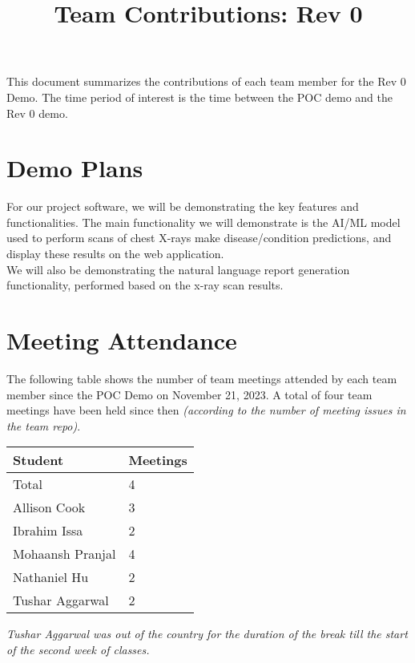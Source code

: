 \documentclass{article}
\title{Team Contributions: Rev 0\\\progname}
\author{\authname}
\date{}
\begin{document}
\maketitle

This document summarizes the contributions of each team member for the Rev 0
Demo.  The time period of interest is the time between the POC demo and the Rev
0 demo.

\section{Demo Plans}

For our project software, we will be demonstrating the key features and
functionalities. The main functionality we will demonstrate is the AI/ML model
used to perform scans of chest X-rays make disease/condition predictions, and
display these results on the web application. \\
We will also be demonstrating the natural language report generation
functionality, performed based on the x-ray scan results.

\section{Meeting Attendance}

The following table shows the number of team meetings attended by each team
member since the POC Demo on November 21, 2023. A total of four team meetings
have been held since then \textit{(according to the number of meeting issues
in the team repo)}.

\begin{table}[H]
  \centering
  \begin{tabular}{ll}
    \toprule
    \textbf{Student} & \textbf{Meetings} \\
    \midrule
    Total & 4 \\
    Allison Cook & 3 \\
    Ibrahim Issa & 2 \\
    Mohaansh Pranjal & 4 \\
    Nathaniel Hu & 2 \\
    Tushar Aggarwal & 2 \\
    \bottomrule
  \end{tabular}
\end{table}

\noindent \textit{Tushar Aggarwal was out of the country for the duration of
the break till the start of the second week of classes.}
\end{document}
